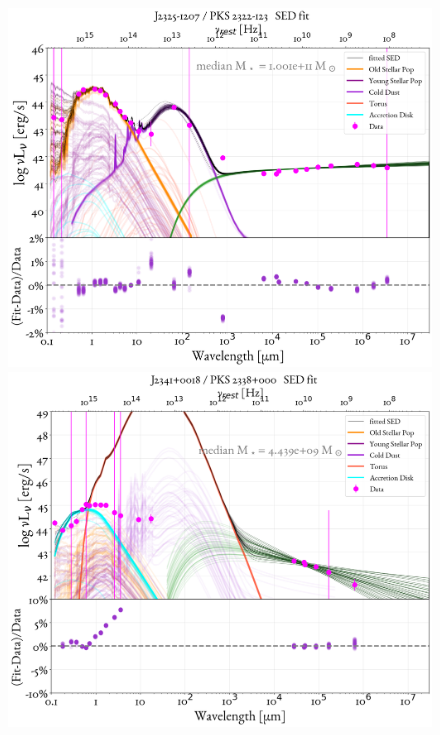 \begin{figure}
    \centering
    \includegraphics[width=0.85\linewidth]{figures/ResultFits/85_SEDfit_5132.png}\\
    \includegraphics[width=0.85\linewidth]{figures/ResultFits/86_SEDfit_5170.png}    
\end{figure}
